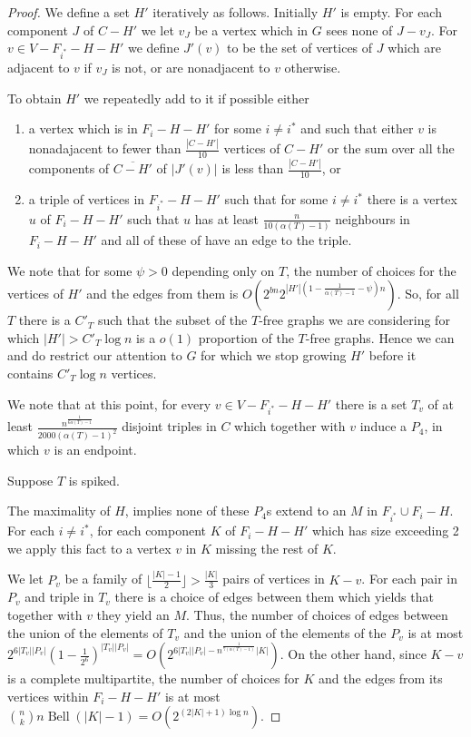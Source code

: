 \documentclass[12pt]{article}
\theoremstyle{definition}
\DeclareMathOperator{\Bell}{Bell}
\begin{document}
\begin{proof}

We define a set $H'$ iteratively as follows. Initially $H'$ is empty. 
For each component $J$ of $C-H' $ we let $v_J$ be a vertex which in $G$ sees none of $J-v_J$. 
For $v\in V-F_{i^*}-H-H'$ we define $J'(v)$ to be the set of vertices of $J$ which are adjacent to $v$ if $v_J$ is not, or are nonadjacent to $v$ otherwise. 

To obtain  $H'$ we  repeatedly add to it  if possible either 
\begin{enumerate}
\item[(a)]  a vertex which  is  in $F_i-H-H'$ for some $i \neq {i^*}$  and such that either $v$ is nonadajacent to fewer than $\frac{|C-H'|}{10}$
vertices of $C-H'$ or the sum over all the components  of  $\overline{C-H'} $ of  $|J'(v)|$
is less than $\frac{|C-H'|}{10}$, or 
\item[(b)] a triple of vertices   in $F_{i^*}-H-H'$  such that  for some $i \neq {i^*}$  there is a vertex $u$ of $F_i-H-H'$ such that $u$  has at least
$\frac{n}{10(\alpha(T)-1)}$ neighbours in $F_i-H-H'$  and all of these of have an edge to the triple.  
\end{enumerate}

We note that for some $\psi>0$ depending only on $T$,  the number of choices for the vertices of $H'$ and the edges from them is $O(2^{bn}2^{|H'|(1-\frac{1}{\alpha(T)-1}-\psi)n})$. 
So, for all $T$ there is a $C'_T$ such that  the subset of the $T$-free graphs  we are considering for which $|H'|>C'_T \log n$ is a $o(1)$ proportion of the $T$-free graphs. 
Hence we can  and do restrict our attention to $G$ for which we stop growing $H'$ before it contains $C'_T \log n$ vertices. 


We note that at this point, for every $v \in V-F_{i^*}-H-H'$  there  is a set $T_v$ of at least $\frac{n^{\frac{1}{6\alpha(T)-1}}}{2000(\alpha(T)-1)^2}$ disjoint triples  in $C$ which together with $v$ induce a $P_4$, in which $v$ is an endpoint. 

Suppose $T$ is spiked. 

The maximality of $H$,  implies  none of these $P_4$s extend to an  $M$ in $F_{i^*} \cup F_i-H$.
For each $i \neq i^*$,  for each component $K$ of $F_i-H-H'$ which has size exceeding 2
we apply  this fact to a vertex  $v$ in $K$ missing the rest of $K$. 


We let $P_v$  be a family of $\lfloor \frac{|K|-1}{2} \rfloor>\frac{|K|}{3}$ pairs 
of vertices in $K-v$. For each pair in $P_v$ and triple in $T_v$ there is a choice of edges between them which yields that together 
with $v$ they yield an $M$. Thus, the number of choices of edges between the union of the elements of $T_v$ and the union of the elements 
of the $P_v$ is at most $2^{6|T_v||P_v|}(1-\frac{1}{2^6})^{|T_v||P_v|}= O( 2^{6|T_v||P_v|- n^{\frac{1}{7(\alpha(T)-1)}}|K|})$. 
On the other hand,  since $K-v$ is a complete multipartite,  the number of choices for $K$ and the edges from its vertices within $F_i-H-H'$  is at most ${n \choose k}n \Bell(|K|-1)
=O(2^{(2|K|+1)\log n})$. 


\end{proof}
\end{document}
